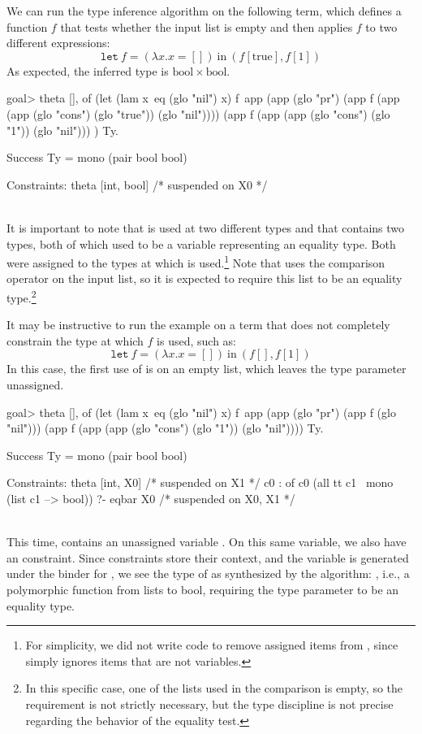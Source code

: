 \documentclass[a4paper, 11pt]{book}
\newenvironment{elpicode}
  {\VerbatimEnvironment~\\\begin{elpibox}\begin{xelpicode}}{\end{xelpicode}
\end{elpibox}\\}
\begin{document}
\noindent
We can run the type inference algorithm on the following term, which defines a
function $f$ that tests whether the input list is empty and then applies $f$ to
two different expressions:
$$
\mathtt{let}\ f = (\lambda x. x = [])\ \mathrm{in}\ (f [\mathrm{true}], f [1])
$$
As expected, the inferred type is $\mathrm{bool} \times \mathrm{bool}$.
\begin{elpicode}
goal> theta [],
  of (let (lam x\ eq (glo "nil") x) f\
       app (app (glo "pr")
        (app f (app (app (glo "cons") (glo "true")) (glo "nil"))))
        (app f (app (app (glo "cons") (glo "1"))    (glo "nil")))
     ) Ty.

Success
  Ty = mono (pair bool bool)
 
Constraints:
  theta [int, bool]  /* suspended on X0 */
\end{elpicode}
It is important to note that  is used at two different types and that
\elpi{theta} contains two types, both of which used to be a variable representing an
equality type. Both were assigned to the types at which \elpi{f} is used.\footnote{
For simplicity, we did not write code to remove assigned items from
\elpi{theta}, since \elpi{bind} simply ignores items that are not variables.}
Note that \elpi{f} uses the comparison operator on the input list, so it is
expected to require this list to be an equality type.\footnote{In this specific
case, one of the lists used in the comparison is empty, so the requirement is
not strictly necessary, but the type discipline is not precise regarding the
behavior of the equality test.}

It may be instructive to run the example on a term that does not completely
constrain the type at which $f$ is used, such as:
$$
\mathtt{let}\ f = (\lambda x. x = [])\ \mathrm{in}\ (f [], f [1])
$$
In this case, the first use of  is on an empty list, which leaves the
type parameter unassigned.
\begin{elpicode}
goal> theta [],
  of (let (lam x\ eq (glo "nil") x) f\
        app (app (glo "pr")
          (app f (glo "nil")))
          (app f (app (app (glo "cons") (glo "1")) (glo "nil"))))
     Ty.

Success
  Ty = mono (pair bool bool)
 
Constraints:
 theta [int, X0] 
   /* suspended on X1 */
 {c0} : of c0 (all tt c1 \ mono (list c1 --> bool)) ?- eqbar X0 
   /* suspended on X0, X1 */
\end{elpicode}
This time,  contains an unassigned variable . On this same
variable, we also have an  constraint. Since constraints store their
context, and the variable is generated under the binder for \elpi{f}, we see
the type of \elpi{f} as synthesized by the algorithm: \ocaml{''a list -> bool},
i.e., a polymorphic function from lists to bool, requiring the type parameter to
be an equality type.
\end{document}
